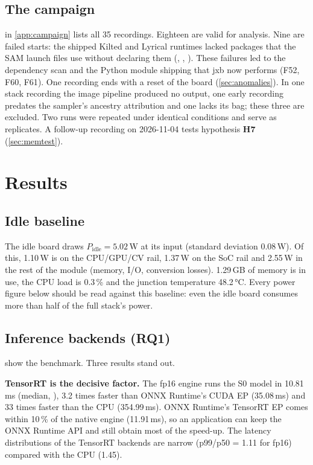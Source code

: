 \documentclass[11pt,a4paper]{article}
\newcommand{\jxb}{\textsf{jxb}}
\newcommand{\finding}[1]{\textsf{\small F#1}}
\newcommand{\hyp}[1]{\textbf{H#1}}
\begin{document}
\subsection{The campaign}
 in \cref{app:campaign} lists all 35 recordings. Eighteen are valid for analysis. Nine are failed
starts: the shipped Kilted and Lyrical runtimes lacked packages that the SAM launch files use without declaring them
(, , ). These failures led to the dependency scan and the
Python module shipping that \jxb{} now performs (\finding{52}, \finding{60}, \finding{61}). One recording ends with a
reset of the board (\cref{sec:anomalies}). In one stack recording the image pipeline produced no output, one early
recording predates the sampler's ancestry attribution and one lacks its bag; these three are excluded. Two runs were repeated under
identical conditions and serve as replicates. A follow-up recording on 2026-11-04 tests hypothesis \hyp{7}
(\cref{sec:memtest}).

\section{Results}\label{sec:results}

\subsection{Idle baseline}\label{sec:idle}
The idle board draws $P_{\mathrm{idle}} = 5.02$\,W at its input (standard deviation 0.08\,W). Of this, 1.10\,W is on
the CPU/GPU/CV rail, 1.37\,W on the SoC rail and 2.55\,W in the rest of the module (memory, I/O, conversion losses).
1.29\,GB of memory is in use, the CPU load is 0.3\,\% and the junction temperature 48.2\,\si{\celsius}. Every
power figure below should be read against this baseline: even the idle board consumes more than half of the full
stack's power.

\subsection{Inference backends (RQ1)}\label{sec:bench}
 show the benchmark. Three results stand out.

\textbf{TensorRT is the decisive factor.} The fp16 engine runs the S0 model in 10.81\,ms (median, ),
3.2 times faster than ONNX Runtime's CUDA EP (35.08\,ms) and 33 times faster than the CPU (354.99\,ms). ONNX Runtime's
TensorRT EP comes within 10\,\% of the native engine (11.91\,ms), so an application can keep the ONNX Runtime API
and still obtain most of the speed-up. The latency distributions of the TensorRT backends are narrow (p99/p50 =
1.11 for  fp16) compared with the CPU (1.45).
\end{document}

